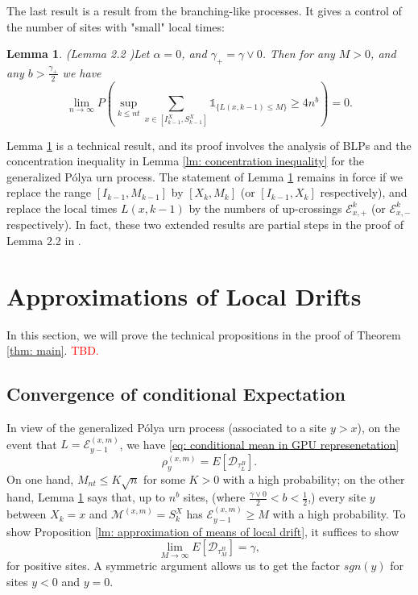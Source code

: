 \documentclass[twoside,12pt,a4paper]{article}
\newtheorem{lemma}{Lemma}[section]
\numberwithin{equation}{section}
\newcommand\TBD{\textcolor{red}{TBD.}}
\begin{document}
		
		The last result is a result from the branching-like processes. It gives a control of the number of sites with "small" local times:
		\begin{lemma}(Lemma 2.2 \cite{KMP22})\label{lm: number of rarely visit sites}
			Let $\alpha =0$, and $\gamma_+ = \gamma \vee 0$. Then for any $M>0$, and any $b>\frac{\gamma_+}{2}$ we have
			$$
			\lim_{n\to\infty} P\left(\sup_{k\leq nt}  \sum_{x\in [I^X_{k-1}, S^X_{k-1}]} \mathbb{1}_{\{ L(x,k-1) \leq M \}} \geq 4n^b \right) = 0.
			$$
			
		\end{lemma}	
		Lemma \ref{lm: number of rarely visit sites} is a technical result, and its proof involves the analysis of BLPs and the concentration inequality in Lemma \ref{lm: concentration inequality} for the generalized P\'{o}lya urn process. The statement of Lemma \ref{lm: number of rarely visit sites} remains in force if we replace the range $[I_{k-1}, M_{k-1}]$ by $[X_k,M_k]$ (or $[I_{k-1},X_k]$ respectively), and replace the local times $L(x,k-1)$ by the numbers of up-crossings $\mathcal{E}^{k}_{x,+}$ (or $\mathcal{E}^{k}_{x,-}$ respectively). In fact, these two extended results are partial steps in the proof of Lemma 2.2 in \cite{KMP22}.   
		
		
		\section{Approximations of Local Drifts}\label{sec: approximations}
		In this section, we will prove the technical propositions in the proof of Theorem \ref{thm: main}. \TBD
		
		
		\subsection{Convergence of conditional Expectation}
		In view of the generalized P\'{o}lya urn process (associated to a site $y> x$), on the event that $ L = \mathcal{E}^{(x,m)}_{y-1}$, we have \eqref{eq: conditional mean in GPU represenetation} 
		$$\rho^{(x,m)}_y = E[\mathcal{D}_{\tau_L^B}].$$ 
		On one hand, $M_{nt} \leq K\sqrt{n} $ for some $K>0$ with a high probability; on the other hand, Lemma \ref{lm: number of rarely visit sites} says that, up to $n^b$ sites, (where $\frac{\gamma \vee 0}{2}<b<\frac{1}{2}$,) every site $y$ between $X_k=x$ and $\mathcal{M}^{(x,m)} =S_{k}^X$ has $ \mathcal{E}^{(x,m)}_{y-1} \geq M  $ with a high probability. To show Proposition \ref{lm: approximation of means of local drift}, it suffices to show 
		\begin{equation}\label{eq: convergence of conditional expectation}
			\lim_{M\to\infty} E[\mathcal{D}_{\tau_M^B}] = \gamma , 
		\end{equation} for positive sites. A symmetric argument allows us to get the factor $sgn(y)$ for sites $y<0$ and $y=0$.
		
\end{document}
